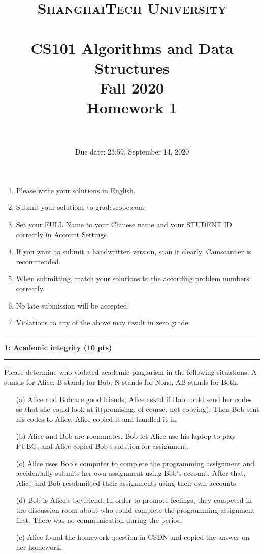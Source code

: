 \documentclass[10.5pt]{article}
\title{
	\normalfont \normalsize
	\textsc{ShanghaiTech University} \\ [25pt]
	\horrule{0.5pt} \\[0.4cm] %
	\huge CS101 Algorithms and Data Structures\\ %
	\LARGE Fall 2020\\
	\LARGE Homework 1\\
	\horrule{2pt} \\[0.5cm] %
}
\author{}
\date{Due date: 23:59, September 14, 2020}
\newcommand\question[2]{\vspace{.25in}\hrule\textbf{#1: #2}\vspace{.5em}\hrule\vspace{.10in}}
\begin{document}
	
	\maketitle
	\thispagestyle{firstpage}
	\vspace{3ex}
	
	\begin{enumerate}
		\item Please write your solutions in English. 
		
		\item Submit your solutions to gradescope.com.  
		
		\item Set your FULL Name to your Chinese name and your STUDENT ID correctly in Account Settings. 
		
		\item If you want to submit a handwritten version, scan it clearly. Camscanner is recommended. 
		
		\item When submitting, match your solutions to the according problem numbers correctly. 
		
		\item No late submission will be accepted.
		
		\item Violations to any of the above may result in zero grade. 
	\end{enumerate}
	\newpage
	
  \question{1}{Academic integrity (10 pts)}
    
    Please determine who violated academic plagiarism in the following situations. A stands for Alice, B stands for Bob, N stands for None, AB stands for Both.
    	\begin{itemize}
    		\item[(a)]Alice and Bob are good friends, Alice asked if Bob could send her codes so that she could look at it(promising, of course, not copying). Then Bob sent his codes to Alice, Alice copied it and handled it in.
    		\item[(b)]Alice and Bob are roommates. Bob let Alice use his laptop to play PUBG, and Alice copied Bob's solution for assignment.
    		\item[(c)]Alice uses Bob's computer to complete the programming assignment and accidentally submits her own assignment using Bob's account. After that, Alice and Bob resubmitted their assignments using their own accounts.
    		\item[(d)]Bob is Alice's boyfriend. In order to promote feelings, they competed in the discussion room about who could complete the programming assignment first. There was no communication during the period.
    		\item[(e)]Alice found the homework question in CSDN and copied the answer on her homework.
    	\end{itemize}
	
\end{document}
